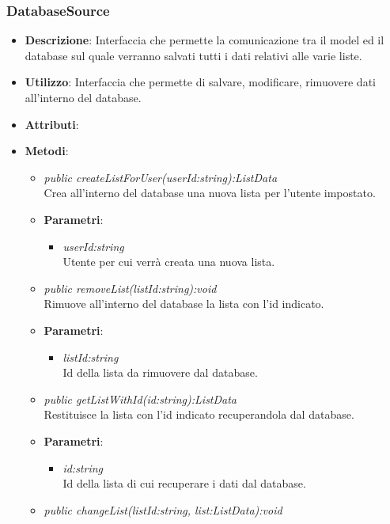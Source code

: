 \subsubsection{DatabaseSource}
\begin{itemize}
\item \textbf{Descrizione}: Interfaccia che permette la comunicazione tra il model ed il database sul quale verranno salvati tutti i dati relativi alle varie liste.
\item \textbf{Utilizzo}: Interfaccia che permette di salvare, modificare, rimuovere dati all'interno del database.
\item \textbf{Attributi}: 
\item \textbf{Metodi}:
	\begin{itemize}
	\item \textit{public createListForUser(userId:string):ListData}\\
		Crea all'interno del database una nuova lista per l'utente impostato.
			\item{\textbf{Parametri}: \begin{itemize}
			\item \textit{userId:string}\\
			Utente per cui verrà creata una nuova lista.
			\end{itemize}}
	\item \textit{public removeList(listId:string):void}\\
	Rimuove all'interno del database la lista con l'id indicato.
			\item{\textbf{Parametri}: \begin{itemize}
			\item \textit{listId:string}\\
				Id della lista da rimuovere dal database.
			\end{itemize}}
	\item \textit{public getListWithId(id:string):ListData}\\
	Restituisce la lista con l'id indicato recuperandola dal database.
			\item{\textbf{Parametri}: \begin{itemize}
			\item \textit{id:string}\\
			Id della lista di cui recuperare i dati dal database.
			\end{itemize}}
	\item \textit{public changeList(listId:string, list:ListData):void}\\

\end{itemize}
\end{itemize}
